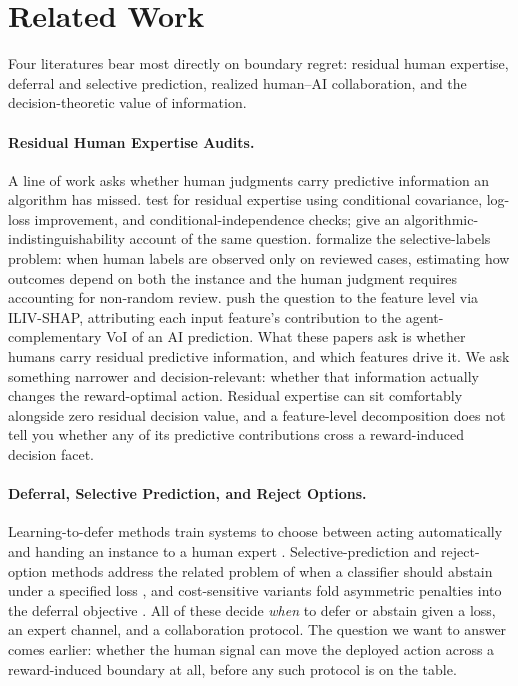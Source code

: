 \section{Related Work}
\label{sec:related}

Four literatures bear most directly on boundary regret: residual human expertise, deferral and selective prediction, realized human--AI collaboration, and the decision-theoretic value of information.

\paragraph{Residual Human Expertise Audits.}
A line of work asks whether human judgments carry predictive information an algorithm has missed.
\citet{AlurEtAl2023} test for residual expertise using conditional covariance, log-loss improvement, and conditional-independence checks; \citet{AlurRaghavanShah2024} give an algorithmic-indistinguishability account of the same question.
\citet{KleinbergEtAl2018} formalize the selective-labels problem: when human labels are observed only on reviewed cases, estimating how outcomes depend on both the instance and the human judgment requires accounting for non-random review.
\citet{GuoEtAl2025} push the question to the feature level via ILIV-SHAP, attributing each input feature's contribution to the agent-complementary VoI of an AI prediction.
What these papers ask is whether humans carry residual predictive information, and which features drive it. We ask something narrower and decision-relevant: whether that information actually changes the reward-optimal action. Residual expertise can sit comfortably alongside zero residual decision value, and a feature-level decomposition does not tell you whether any of its predictive contributions cross a reward-induced decision facet.

\paragraph{Deferral, Selective Prediction, and Reject Options.}
Learning-to-defer methods train systems to choose between acting automatically and handing an instance to a human expert \citep{MadraseEtAl2018,MozannarSontag2020,HemmerEtAl2023,MaoMohri2023}.
Selective-prediction and reject-option methods address the related problem of when a classifier should abstain under a specified loss \citep{RamaswamyEtAl2018,FrancPrusa2023}, and cost-sensitive variants fold asymmetric penalties into the deferral objective \citep{AlvesEtAl2024}.
All of these decide \emph{when} to defer or abstain given a loss, an expert channel, and a collaboration protocol. The question we want to answer comes earlier: whether the human signal can move the deployed action across a reward-induced boundary at all, before any such protocol is on the table.

